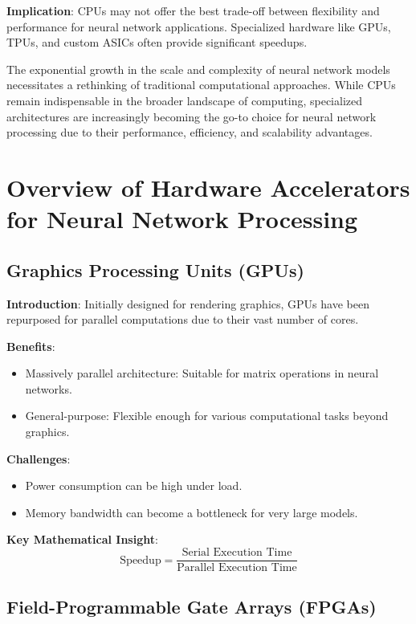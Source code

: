 \textbf{Implication}: CPUs may not offer the best trade-off between flexibility and performance for neural network applications. Specialized hardware like GPUs, TPUs, and custom ASICs often provide significant speedups.

The exponential growth in the scale and complexity of neural network models necessitates a rethinking of traditional computational approaches. While CPUs remain indispensable in the broader landscape of computing, specialized architectures are increasingly becoming the go-to choice for neural network processing due to their performance, efficiency, and scalability advantages.


\section{Overview of Hardware Accelerators for Neural Network Processing}

\subsection{Graphics Processing Units (GPUs)}

\textbf{Introduction}: Initially designed for rendering graphics, GPUs have been repurposed for parallel computations due to their vast number of cores.

\textbf{Benefits}:
\begin{itemize}
	\item Massively parallel architecture: Suitable for matrix operations in neural networks.
	\item General-purpose: Flexible enough for various computational tasks beyond graphics.
\end{itemize}

\textbf{Challenges}:
\begin{itemize}
	\item Power consumption can be high under load.
	\item Memory bandwidth can become a bottleneck for very large models.
\end{itemize}

\textbf{Key Mathematical Insight}:
\[ \text{Speedup} = \frac{\text{Serial Execution Time}}{\text{Parallel Execution Time}} \]

\subsection{Field-Programmable Gate Arrays (FPGAs)}


